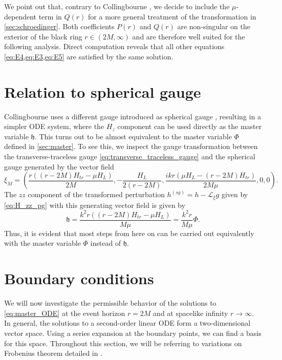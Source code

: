 \documentclass[11pt,aip,jmp,amsmath,amssymb,draft]{revtex4-1}
\begin{document}
We point out that, contrary to Collingbourne \cite{collingbourne2021gregory}, we decide to include the $\mu$-dependent term in $Q(r)$ for a more general treatment of the transformation in \cref{sec:schroedinger}. 
Both coefficients $P(r)$ and $Q(r)$ are non-singular on the exterior of the black ring $r \in(2M,\infty)$ and are therefore well suited for the following analysis.
Direct computation reveals that all other equations \cref{eq:E4,eq:E3,eq:E5} are satisfied by the same solution.


\section{\label{sec:relation_spherical} Relation to spherical gauge} 
Collingbourne uses a different gauge introduced as spherical gauge \cite[Chapter~III]{collingbourne2021gregory}, resulting in a simpler ODE system, where the $H_z$ component can be used directly as the master variable $\mathfrak{h}$. 
This turns out to be almost equivalent to the master variable $\Phi$ defined in \cref{sec:master}.  
To see this, we inspect the gauge transformation between the transverse-traceless gauge \cref{eq:transverse_traceless_gauge} and the spherical gauge generated by the vector field
\begin{equation}
    \xi_M = \left(\frac{r ((r-2 M)H_{tr}-\mu H_L)}{2 M},-\frac{H_L}{2 (r-2 M)},\frac{i k r(\mu H_L - (r-2M)H_{tr})}{2 M\mu},0,0\right).
\end{equation}
The $zz$ component of the transformed perturbation $h^{(sg)} = h - \mathcal L_\xi g$ given by \cref{eq:H_zz_pg} with this generating vector field is given by
\begin{equation} \label{eq:hfrak_phi}
    \mathfrak{h}= \frac{k^2 r \left((r-2 M) H_{tr}-\mu H_L\right)}{M \mu} = \frac{k^2 r}{M \mu} \Phi.
\end{equation}
Thus, it is evident that most steps from here on can be carried out equivalently with the master variable $\Phi$ instead of $\mathfrak{h}$.

\section{\label{sec:boundary} Boundary conditions}
We will now investigate the permissible behavior of the solutions to \cref{eq:master_ODE} at the event horizon $r = 2M$ and at spacelike infinity $r \to \infty$.
In general, the solutions to a second-order linear ODE form a two-dimensional vector space. Using a series expansion at the boundary points, we can find a basis for this space. Throughout this section, we will be referring to variations on Frobenius theorem detailed in \cite[Appendix~B]{collingbourne2021gregory}.
\end{document}
